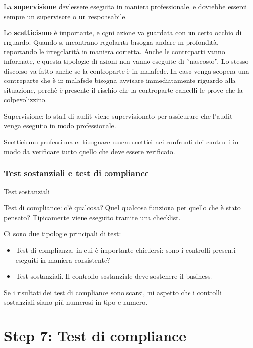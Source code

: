 La \textbf{supervisione} dev'essere eseguita in maniera professionale, e 
dovrebbe esserci sempre un supervisore o un responsabile.

Lo \textbf{scetticismo} è importante, e ogni azione va guardata con un certo 
occhio di riguardo. Quando si incontrano regolarità bisogna andare in 
profondità, reportando le irregolarità in maniera corretta. Anche le 
controparti vanno informate, e questa tipologie di azioni non vanno eseguite di 
``nascosto''. Lo stesso discorso va fatto anche se la controparte è in malafede.
In caso venga scopera una controparte che è in malafede bisogna avvisare 
immediatamente riguardo alla situazione, perchè è presente il rischio che la 
controparte cancelli le prove che la colpevolizzino.





Supervisione: lo staff di audit viene supervisionato per assicurare che l'audit 
venga eseguito in modo professionale.

Scetticismo professionale: bisognare essere scettici nei confronti dei 
controlli in modo da verificare tutto quello che deve essere verificato.


\subsubsection{Test sostanziali e test di compliance}

Test sostanziali 

Test di compliance: c'è qualcosa? Quel qualcosa funziona per quello che è stato 
pensato? Tipicamente viene eseguito tramite una checklist.

Ci sono due tipologie principali di test:
\begin{itemize}
\item Test di complianza, in cui è importante chiedersi: sono i controlli 
presenti eseguiti in maniera consistente?
\item Test sostanziali. Il controllo sostanziale deve sostenere il business. 
\end{itemize}


Se i risultati dei test di compliance sono scarsi, mi aspetto che i controlli 
sostanziali siano più numerosi in tipo e numero.

\section{Step 7: Test di compliance}

